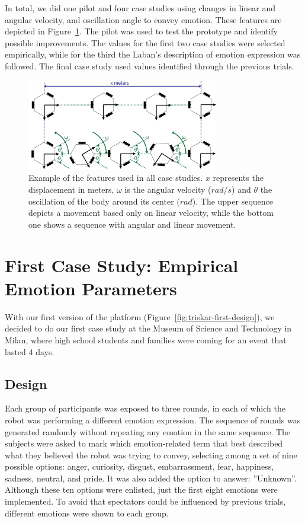 In total, we did one pilot and four case studies using changes in linear and angular velocity, and oscillation angle to convey emotion. These features are depicted in Figure~\ref{fig:features}. The pilot was used to test the prototype and identify possible improvements. The values for the first two case studies were selected empirically, while for the third the Laban's description of emotion expression was followed. The final case study used values identified through the previous trials.
 
\begin{figure}[h]
	\centering
	\includegraphics[width=0.75\textwidth]{./Images/ExampleMovement.png}
	\caption{Example of the features used in all case studies. $x$ represents the displacement in meters, $\omega$ is the angular velocity ($rad/s$) and $\theta$ the oscillation of the body around its center ($rad$). The upper sequence depicts a movement based only on linear velocity, while the bottom one shows a sequence with angular and linear movement.}
	\label{fig:features}
\end{figure} 

\section{First Case Study: Empirical Emotion Parameters}

With our first version of the platform (Figure~\ref{fig:triskar-first-design}), we decided to do our first case study at the Museum of Science and Technology in Milan, where high school students and families were coming for an event that lasted 4 days. 

\subsection{Design}

Each group of participants was exposed to three rounds, in each of which the robot was performing a different emotion expression. The sequence of rounds was generated randomly without repeating any emotion in the same sequence. The subjects were asked to mark which emotion-related term that best described what they believed the robot was trying to convey, selecting among a set of nine possible options: anger, curiosity, disgust, embarrassment, fear, happiness, sadness, neutral, and pride. It was also added the option to answer: ''Unknown''. Although these ten options were enlisted, just the first eight emotions were implemented. To avoid that spectators could be influenced by previous trials, different emotions were shown to each group.

